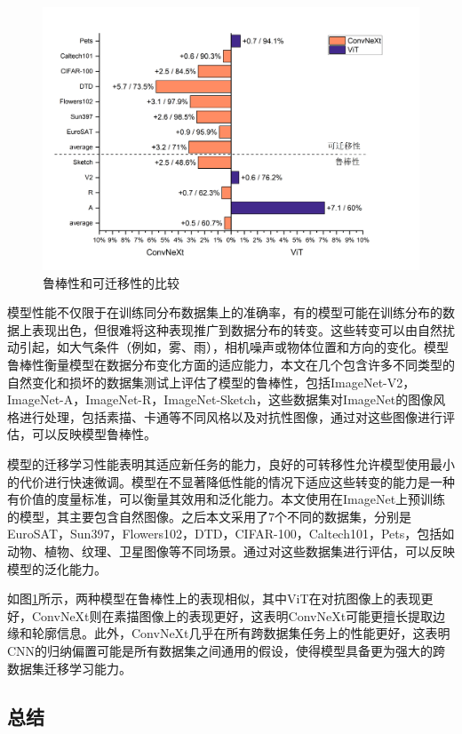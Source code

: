 \begin{figure}[H]
    \centering
    \includegraphics[width=\textwidth]{pics/R&T.2.png}
    \caption{鲁棒性和可迁移性的比较}
    \label{fig:r&t}
\end{figure}

模型性能不仅限于在训练同分布数据集上的准确率，有的模型可能在训练分布的数据上表现出色，但很难将这种表现推广到数据分布的转变。这些转变可以由自然扰动引起，如大气条件（例如，雾、雨），相机噪声或物体位置和方向的变化。模型鲁棒性衡量模型在数据分布变化方面的适应能力，本文在几个包含许多不同类型的自然变化和损坏的数据集测试上评估了模型的鲁棒性，包括ImageNet-V2，ImageNet-A，ImageNet-R，ImageNet-Sketch，这些数据集对ImageNet的图像风格进行处理，包括素描、卡通等不同风格以及对抗性图像，通过对这些图像进行评估，可以反映模型鲁棒性。

模型的迁移学习性能表明其适应新任务的能力，良好的可转移性允许模型使用最小的代价进行快速微调。模型在不显著降低性能的情况下适应这些转变的能力是一种有价值的度量标准，可以衡量其效用和泛化能力。本文使用在ImageNet上预训练的模型，其主要包含自然图像。之后本文采用了7个不同的数据集，分别是EuroSAT，Sun397，Flowers102，DTD，CIFAR-100，Caltech101，Pets，包括如动物、植物、纹理、卫星图像等不同场景。通过对这些数据集进行评估，可以反映模型的泛化能力。

如图\ref{fig:r&t}所示，两种模型在鲁棒性上的表现相似，其中ViT在对抗图像上的表现更好，ConvNeXt则在素描图像上的表现更好，这表明ConvNeXt可能更擅长提取边缘和轮廓信息。此外，ConvNeXt几乎在所有跨数据集任务上的性能更好，这表明CNN的归纳偏置可能是所有数据集之间通用的假设，使得模型具备更为强大的跨数据集迁移学习能力。

\subsection{总结}

